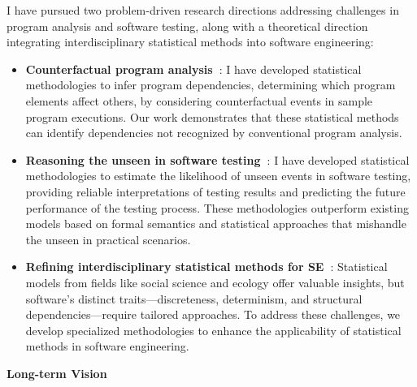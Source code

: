 \documentclass{article}
\begin{document}
\vspace{.5em}
\noindent
I have pursued two problem-driven research directions addressing challenges in program analysis and software testing, along with a theoretical direction integrating interdisciplinary statistical methods into software engineering:
\vspace{-.4em}

\begin{itemize}[leftmargin=*,parsep=1pt]
  \item \textbf{Counterfactual program analysis~\cite[Section~\ref{sec:dependency}]{leeObservationbasedApproximateDependency2021,leeCausalProgramDependence2025a,leeEvaluatingLexicalApproximation2020,ohEffectivelySamplingHigher2021}}:
        I have developed statistical methodologies to infer program dependencies, determining which program elements affect others, by considering counterfactual events in sample program executions. Our work demonstrates that these statistical methods can identify dependencies not recognized by conventional program analysis.
  \item \textbf{Reasoning the unseen in software testing~\cite[Section~\ref{sec:unseen}]{leeStatisticalReachabilityAnalysis2023,leeStructureawareResidualRisk2025,leeAccountingMissingEvents2025,liyanageExtrapolatingCoverageRate2024}}:
        I have developed statistical methodologies to estimate the likelihood of unseen events in software testing, providing reliable interpretations of testing results and predicting the future performance of the testing process. These methodologies outperform existing models based on formal semantics and statistical approaches that mishandle the unseen in practical scenarios.
  \item \textbf{Refining interdisciplinary statistical methods for SE~\cite[Section~\ref{sec:refine}]{leeCausalProgramDependence2025a,leeStatisticalReachabilityAnalysis2023,leeHowMuchUnseen2024,leeStructureawareResidualRisk2025}}: 
        Statistical models from fields like social science and ecology offer valuable insights, but software’s distinct traits—discreteness, determinism, and structural dependencies—require tailored approaches. To address these challenges, we develop specialized methodologies to enhance the applicability of statistical methods in software engineering.
\end{itemize}

\noindent\textbf{Long-term Vision}
\vspace{0.5em}
\end{document}
